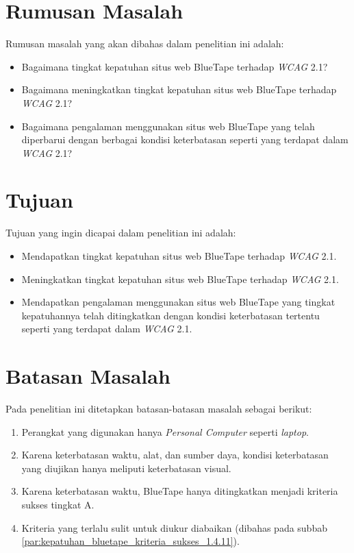 \section{Rumusan Masalah}
\label{sec:rumusan}
Rumusan masalah yang akan dibahas dalam penelitian ini adalah: 
\begin{itemize}
	\item Bagaimana tingkat kepatuhan situs web BlueTape terhadap \textit{WCAG} 2.1?
	\item Bagaimana meningkatkan tingkat kepatuhan situs web BlueTape terhadap \textit{WCAG} 2.1?  
	\item Bagaimana pengalaman menggunakan situs web BlueTape yang telah diperbarui dengan berbagai kondisi keterbatasan seperti yang terdapat dalam \textit{WCAG} 2.1?
\end{itemize}

\section{Tujuan}
\label{sec:tujuan}
Tujuan yang ingin dicapai dalam penelitian ini adalah:
\begin{itemize}
	\item Mendapatkan tingkat kepatuhan situs web BlueTape terhadap \textit{WCAG} 2.1.
	\item Meningkatkan tingkat kepatuhan situs web BlueTape terhadap \textit{WCAG} 2.1.
	\item Mendapatkan pengalaman menggunakan situs web BlueTape yang tingkat kepatuhannya telah ditingkatkan dengan kondisi keterbatasan tertentu seperti yang terdapat dalam \textit{WCAG} 2.1.
\end{itemize}

\section{Batasan Masalah}
\label{sec:batasan}
Pada penelitian ini ditetapkan batasan-batasan masalah sebagai berikut:
\begin{enumerate}
	\item Perangkat yang digunakan hanya \textit{Personal Computer} seperti \textit{laptop}.
	\item Karena keterbatasan waktu, alat, dan sumber daya, kondisi keterbatasan yang diujikan hanya meliputi keterbatasan visual.
	\item Karena keterbatasan waktu, BlueTape hanya ditingkatkan menjadi kriteria sukses tingkat A.
	\item Kriteria yang terlalu sulit untuk diukur diabaikan (dibahas pada subbab \ref{par:kepatuhan_bluetape_kriteria_sukses_1.4.11}).
\end{enumerate}

